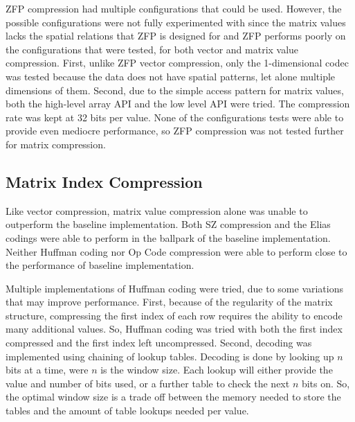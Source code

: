 ZFP compression had multiple configurations that could be used.
However, the possible configurations were not fully experimented with since the matrix values lacks the spatial relations that ZFP is designed for and ZFP performs poorly on the configurations that were tested, for both vector and matrix value compression.
First, unlike ZFP vector compression, only the 1-dimensional codec was tested because the data does not have spatial patterns, let alone multiple dimensions of them.
Second, due to the simple access pattern for matrix values, both the high-level array API and the low level API were tried.
The compression rate was kept at 32 bits per value.
None of the configurations tests were able to provide even mediocre performance, so ZFP compression was not tested further for matrix compression.

\subsection{Matrix Index Compression}
\label{sec:results-inds}
Like vector compression, matrix value compression alone was unable to outperform the baseline implementation.
Both SZ compression and the Elias codings were able to perform in the ballpark of the baseline implementation.
Neither Huffman coding nor Op Code compression were able to perform close to the performance of baseline implementation.


Multiple implementations of Huffman coding were tried, due to some variations that may improve performance.
First, because of the regularity of the matrix structure, compressing the first index of each row requires the ability to encode many additional values.
So, Huffman coding was tried with both the first index compressed and the first index left uncompressed.
Second, decoding was implemented using chaining of lookup tables.
Decoding is done by looking up \(n\) bits at a time, were \(n\) is the window size.
Each lookup will either provide the value and number of bits used, or a further table to check the next \(n\) bits on.
So, the optimal window size is a trade off between the memory needed to store the tables and the amount of table lookups needed per value.

